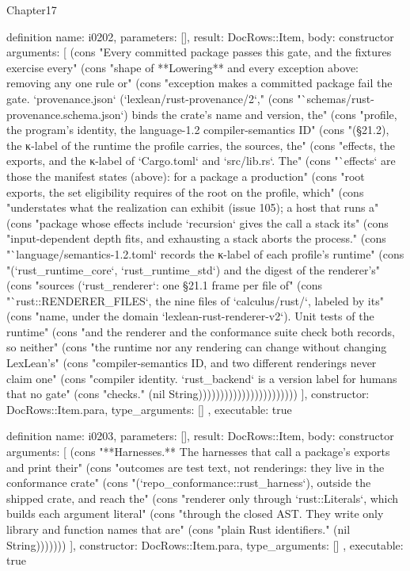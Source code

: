 \begin{lexlean}{Chapter17}
\begin{semanticmodule}
definition{
  name: i0202,
  parameters: [],
  result: DocRows::Item,
  body: constructor{
    arguments: [
      (cons "Every committed package passes this gate, and the fixtures exercise every" (cons "shape of **Lowering** and every exception above: removing any one rule or" (cons "exception makes a committed package fail the gate. `provenance.json` (`lexlean/rust-provenance/2`," (cons "`schemas/rust-provenance.schema.json`) binds the crate's name and version, the" (cons "profile, the program's identity, the language-1.2 compiler-semantics ID" (cons "(§21.2), the κ-label of the runtime the profile carries, the sources, the" (cons "effects, the exports, and the κ-label of `Cargo.toml` and `src/lib.rs`. The" (cons "`effects` are those the manifest states (above): for a package a production" (cons "root exports, the set eligibility requires of the root on the profile, which" (cons "understates what the realization can exhibit (issue 105); a host that runs a" (cons "package whose effects include `recursion` gives the call a stack its" (cons "input-dependent depth fits, and exhausting a stack aborts the process." (cons "`language/semantics-1.2.toml` records the κ-label of each profile's runtime" (cons "(`rust_runtime_core`, `rust_runtime_std`) and the digest of the renderer's" (cons "sources (`rust_renderer`: one §21.1 frame per file of" (cons "`rust::RENDERER_FILES`, the nine files of `calculus/rust/`, labeled by its" (cons "name, under the domain `lexlean-rust-renderer-v2`). Unit tests of the runtime" (cons "and the renderer and the conformance suite check both records, so neither" (cons "the runtime nor any rendering can change without changing LexLean's" (cons "compiler-semantics ID, and two different renderings never claim one" (cons "compiler identity. `rust_backend` is a version label for humans that no gate" (cons "checks." (nil String)))))))))))))))))))))))
    ],
    constructor: DocRows::Item.para,
    type_arguments: []
  },
  executable: true
}

definition{
  name: i0203,
  parameters: [],
  result: DocRows::Item,
  body: constructor{
    arguments: [
      (cons "**Harnesses.** The harnesses that call a package's exports and print their" (cons "outcomes are test text, not renderings: they live in the conformance crate" (cons "(`repo_conformance::rust_harness`), outside the shipped crate, and reach the" (cons "renderer only through `rust::Literals`, which builds each argument literal" (cons "through the closed AST. They write only library and function names that are" (cons "plain Rust identifiers." (nil String)))))))
    ],
    constructor: DocRows::Item.para,
    type_arguments: []
  },
  executable: true
}


\end{semanticmodule}
\end{lexlean}
